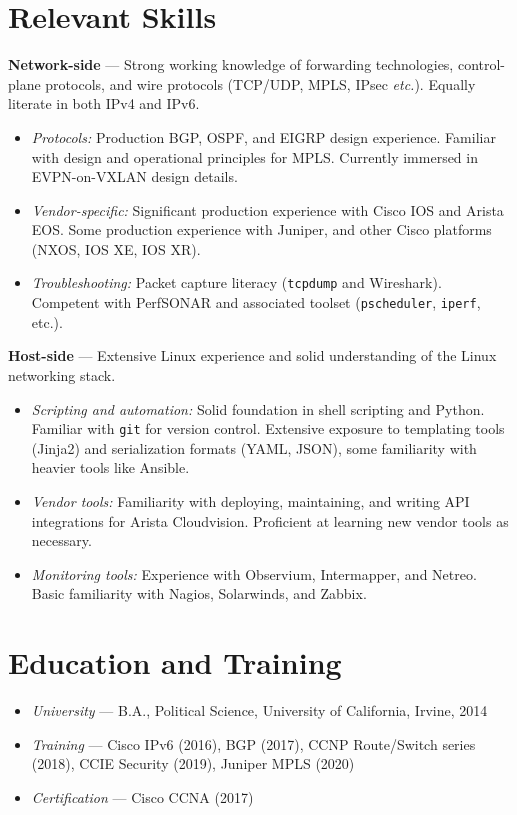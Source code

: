 \documentclass[10pt]{article}
\begin{document}
\section*{Relevant Skills}
\textbf{Network-side} --- Strong working knowledge of forwarding technologies, control-plane protocols, and wire protocols (TCP/UDP, MPLS, IPsec \emph{etc.}). Equally literate in both IPv4 and IPv6.
\begin{itemize}
	\item\emph{Protocols:} Production BGP, OSPF, and EIGRP design experience. Familiar with design and operational principles for MPLS. Currently immersed in EVPN-on-VXLAN design details.
	\item\emph{Vendor-specific:} Significant production experience with Cisco IOS and Arista EOS. Some production experience with Juniper, and other Cisco platforms (NXOS, IOS XE, IOS XR).
	\item\emph{Troubleshooting:} Packet capture literacy (\texttt{tcpdump} and Wireshark). Competent with PerfSONAR and associated toolset (\texttt{pscheduler}, \texttt{iperf}, etc.).
\end{itemize}
\textbf{Host-side} --- Extensive Linux experience and solid understanding of the Linux networking stack. 
\begin{itemize}
	\item\emph{Scripting and automation:} Solid foundation in shell scripting and Python. Familiar with \texttt{git} for version control. Extensive exposure to templating tools (Jinja2) and serialization formats (YAML, JSON), some familiarity with heavier tools like Ansible.
	\item\emph{Vendor tools:} Familiarity with deploying, maintaining, and writing API integrations for Arista Cloudvision. Proficient at learning new vendor tools as necessary.
	\item\emph{Monitoring tools:} Experience with Observium, Intermapper, and Netreo. Basic familiarity with Nagios, Solarwinds, and Zabbix.
\end{itemize}

\section*{Education and Training}

\begin{itemize}
	\item\emph{University} --- B.A., Political Science, University of California, Irvine, 2014
	\item\emph{Training} --- Cisco IPv6 (2016), BGP (2017), CCNP Route/Switch series (2018), CCIE Security (2019), Juniper MPLS (2020)
	\item\emph{Certification} --- Cisco CCNA (2017)
\end{itemize}
\end{document}
